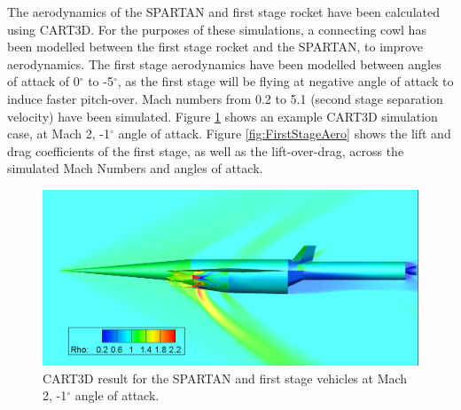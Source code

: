   
  The aerodynamics of the SPARTAN and first stage rocket have been calculated using CART3D. For the purposes of these simulations, a connecting cowl has been modelled between the first stage rocket and the SPARTAN, to improve aerodynamics. The first stage aerodynamics have been modelled between angles of attack of 0$^\circ$ to -5$^\circ$, as the first stage will be flying at negative angle of attack to induce faster pitch-over. Mach numbers from 0.2 to 5.1 (second stage separation velocity) have been simulated. Figure \ref{fig:CARTcontour} shows an example CART3D simulation case, at Mach 2, -1$^\circ$ angle of attack. Figure \ref{fig:FirstStageAero} shows the lift and drag coefficients of the first stage, as well as the lift-over-drag, across the simulated Mach Numbers and angles of attack. 
  
  
  
  \begin{figure}
  	\centering
  	\includegraphics[width=0.7\linewidth]{figures/3_vehicle_design/CARTcontour}
  	\caption{CART3D result for the SPARTAN and first stage vehicles at Mach 2, -1$^\circ$ angle of attack.}
  	\label{fig:CARTcontour}
  \end{figure}

